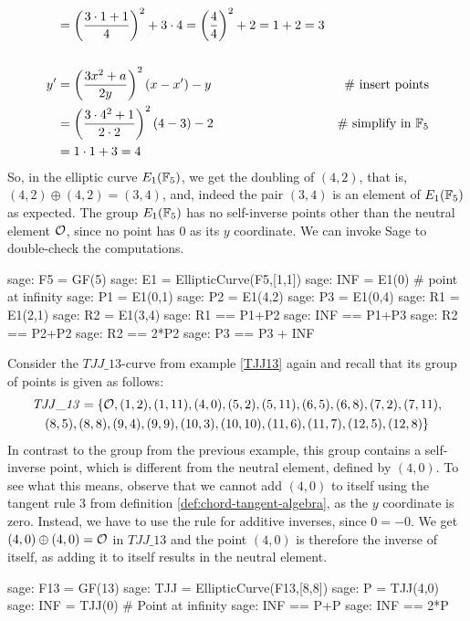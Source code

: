 \begin{example}
\begin{align*}
    & = \left(\frac{3\cdot 1+1}{4}\right)^2 +3\cdot 4
      = \left(\frac{4}{4}\right)^2 +2
      = 1 +2 
      = 3
\\
\\
y'  & = \left(\frac{3x^2+a}{2y}\right)^2\left(x-x'\right) - y  & \text{\# insert points} \\
    & = \left(\frac{3\cdot 4^2+1}{2\cdot 2}\right)^2\left(4-3\right) - 2 & \text{\# simplify in } \mathbb{F}_5\\
    & = 1\cdot 1 + 3
      = 4
\end{align*}
So, in the elliptic curve $E_1(\mathbb{F}_5)$, we get the doubling  of $(4,2)$, that is, $(4,2)\oplus (4,2) =(3,4)$, and, indeed the pair $(3,4)$ is an element of $E_1(\mathbb{F}_5)$ as expected. The group $E_1(\mathbb{F}_5)$ has no self-inverse points other than the neutral element $\mathcal{O}$, since no point has $0$ as its $y$ coordinate. We can invoke Sage to double-check the computations. 
\begin{sagecommandline}
sage: F5 = GF(5)
sage: E1 = EllipticCurve(F5,[1,1])
sage: INF = E1(0) # point at infinity
sage: P1 = E1(0,1)
sage: P2 = E1(4,2)
sage: P3 = E1(0,4)
sage: R1 = E1(2,1)
sage: R2 = E1(3,4)
sage: R1 == P1+P2
sage: INF == P1+P3
sage: R2 == P2+P2
sage: R2 == 2*P2
sage: P3 == P3 + INF
\end{sagecommandline}
\end{example}
\begin{example}\label{ex:TJJ13-self-inverse} Consider the $\mathit{TJJ\_13}$-curve from example \ref{TJJ13} again and recall that its group of points is given as follows:
\begin{multline*}
\mathit{TJJ\_13} = \{\mathcal{O}, (1, 2), (1, 11), (4, 0), (5, 2), (5, 11), (6, 5), (6, 8), (7,2), (7, 11), \\ (8, 5), (8, 8), (9, 4), (9, 9), (10, 3), (10,
10), (11, 6), (11, 7), (12, 5), (12, 8)\}
\end{multline*}
In contrast to the group from the previous example, this group contains a self-inverse point, which is different from the neutral element, defined by $(4,0)$. To see what this means, observe that we cannot add $(4,0)$ to itself using the tangent rule 3 from definition \ref{def:chord-tangent-algebra}, as the $y$ coordinate is zero. Instead, we have to use the rule for additive inverses, since $0=-0$. We get $(4,0)\oplus (4,0)=\mathcal{O}$ in $\mathit{TJJ\_13}$ and the point $(4,0)$ is therefore the inverse of itself, as adding it to itself results in the neutral element. 
\begin{sagecommandline}
sage: F13 = GF(13)
sage: TJJ = EllipticCurve(F13,[8,8])
sage: P = TJJ(4,0)
sage: INF = TJJ(0) # Point at infinity
sage: INF == P+P
sage: INF == 2*P
\end{sagecommandline}
\end{example}
